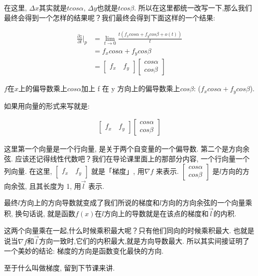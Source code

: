 在这里, $\Delta x$其实就是$t cos \alpha$, $\Delta y$也就是$t cos \beta$. 所以在这里都统一改写一下,那么我们最终会得到一个怎样的结果呢？我们最终会得到下面这样的一个结果: 

\begin{align*}
  \frac{\partial z}{\partial l} \Bigg \vert _p & = \lim_{t \to 0} \frac{t(f_xcos \alpha + f_y cos\beta + o(t))}{t} \\
  & = f_x cos \alpha + f_y cos \beta \\
  & = \begin{bmatrix} f_x \quad f_y  \end{bmatrix} \begin{bmatrix} cos  \alpha \\ cos \beta \end{bmatrix}
\end{align*}

$f$在$x$上的偏导数乘上$cos \alpha$加上 f 在 y 方向上的偏导数乘上$cos\beta$: ($f_x cos \alpha + f_y cos \beta $). 

如果用向量的形式来写就是: 

\begin{align*}
  \begin{bmatrix} f_x \quad f_y  \end{bmatrix}
  \begin{bmatrix} cos \alpha \\ cos \beta \end{bmatrix}
\end{align*}

这里第一个向量是一个行向量, 是关于两个自变量的一个偏导数. 第二个是方向余弦. 应该还记得线性代数吧？我们在导论课里面上的那部分内容, 一个行向量一个列向量. 在这里, $\begin{bmatrix} f_x \quad f_y \end{bmatrix}$ 就是「梯度」, 用$\nabla f$ 来表示. $\begin{bmatrix} cos \alpha \\ cos \beta \end{bmatrix}$ 是$l$方向的方向余弦, 且其长度为 1, 用$\vec l$ 表示. 

最终$l$方向上的方向导数就变成了我们所说的梯度和$l$方向的方向余弦的一个向量乘积, 换句话说, 就是函数$f(x)$在$l$方向上的导数就是在该点的梯度和$\vec l$的内积. 

这两个向量乘在一起,什么时候乘积最大呢？只有他们同向的时候乘积最大. 也就是说当$\nabla f$和$\vec l$方向一致时,它们的内积最大,就是方向导数最大. 所以其实间接证明了一个美妙的结论: 梯度的方向是函数变化最快的方向. 

至于什么叫做梯度, 留到下节课来讲. 